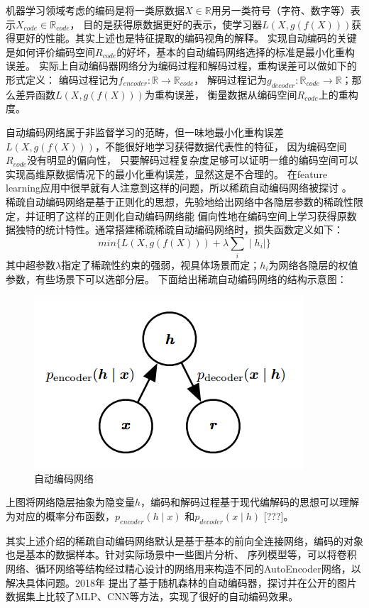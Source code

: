 \documentclass[a4paper,UTF8]{article}
\begin{document}
机器学习领域考虑的编码是将一类原数据$X\in \mathbb{R}$用另一类符号（字符、数字等）表示$X_{code}\in \mathbb{R}_{code}$，
目的是获得原数据更好的表示，使学习器$L(X, g(f(X)))$获得更好的性能。其实上述也是特征提取的编码视角的解释。
实现自动编码的关键是如何评价编码空间${R}_{code}$的好坏，基本的自动编码网络选择的标准是最小化重构误差。
实际上自动编码器网络分为编码过程和解码过程，重构误差可以做如下的形式定义：
编码过程记为$f_{encoder}:\mathbb{R}\to \mathbb{R}_{code}$，
解码过程记为$g_{decoder}:\mathbb{R}_{code}\to \mathbb{R}$；那么差异函数$L(X, g(f(X)))$为重构误差，
衡量数据从编码空间${R}_{code}$上的重构度。

自动编码网络属于非监督学习的范畴，但一味地最小化重构误差$L(X, g(f(X)))$，不能很好地学习获得数据代表性的特征，
因为编码空间${R}_{code}$没有明显的偏向性，
只要解码过程复杂度足够可以证明一维的编码空间可以实现高维原数据情况下的最小化重构误差，显然这是不合理的。
在feature learning应用中很早就有人注意到这样的问题，所以稀疏自动编码网络被探讨
\cite{DBLP:conf/nips/RanzatoPCL06}。
稀疏自动编码网络是基于正则化的思想，先验地给出网络中各隐层参数的稀疏性限定，并证明了这样的正则化自动编码网络能
偏向性地在编码空间上学习获得原数据独特的统计特性。通常搭建稀疏稀疏自动编码网络时，损失函数定义如下：
$$ min\{ L(X, g(f(X))) + \lambda\sum_{i} \mid h_{i} \mid \}$$
其中超参数$\lambda$指定了稀疏性约束的强弱，视具体场景而定；$h_{i}$为网络各隐层的权值参数，有些场景下可以选部分层。
下面给出稀疏自动编码网络的结构示意图：
\begin{figure}[!htbp]
  \centering
  \includegraphics[scale=0.4]{SAE1.0.png}
  \caption{自动编码网络}
\end{figure}

上图将网络隐层抽象为隐变量$h$，编码和解码过程基于现代编解码的思想可以理解为对应的概率分布函数，$p_{encoder}(h\mid x)$
和$p_{decoder}(x\mid h)$
[???]。

其实上述介绍的稀疏自动编码网络默认是基于基本的前向全连接网络，编码的对象也是基本的数据样本。针对实际场景中一些图片分析、
序列模型等，可以将卷积网络、循环网络等结构经过精心设计的网络用来构造不同的AutoEncoder网络，以解决具体问题。2018年
\cite{DBLP:conf/aaai/FengZ18a}
提出了基于随机森林的自动编码器，探讨并在公开的图片数据集上比较了MLP、CNN等方法，实现了很好的自动编码效果。
\end{document}
